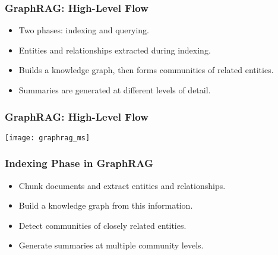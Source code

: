 
	

	

\begin{frame}[fragile]\frametitle{GraphRAG: High-Level Flow}
  \begin{itemize}
    \item Two phases: indexing and querying.
    \item Entities and relationships extracted during indexing.
    \item Builds a knowledge graph, then forms communities of related entities.
    \item Summaries are generated at different levels of detail.
  \end{itemize}
\end{frame}

\begin{frame}[fragile]\frametitle{GraphRAG: High-Level Flow}

	\begin{center}
	\texttt{[image: graphrag\_ms]}
	\end{center}
	
\end{frame}

\begin{frame}[fragile]\frametitle{Indexing Phase in GraphRAG}
  \begin{itemize}
    \item Chunk documents and extract entities and relationships.
    \item Build a knowledge graph from this information.
    \item Detect communities of closely related entities.
    \item Generate summaries at multiple community levels.
  \end{itemize}
\end{frame}

